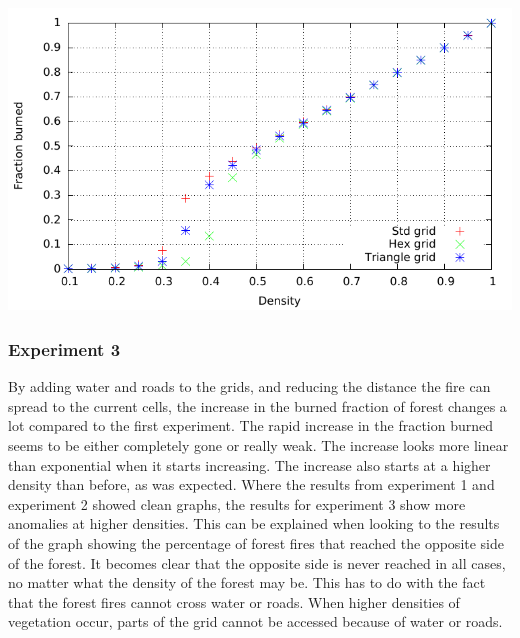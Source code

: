 \documentclass{article}
\newenvironment{Figure}
  {\par\medskip\noindent\minipage{\linewidth}}
  {\endminipage\par\medskip}
\begin{document}
\begin{multicols}{2}
\begin{Figure}
 \centering
 \includegraphics[width=\textwidth]{imgs/plot/ex2/fracburned.pdf}
\label{fig:ex2frac}
\end{Figure}
\subsubsection*{Experiment 3}
By adding water and roads to the grids, and reducing the distance the fire can spread to the current cells, the increase in the burned fraction of forest changes a lot compared to the first experiment. The rapid increase in the fraction burned seems to be either completely gone or really weak. The increase looks more linear than exponential when it starts increasing. The increase also starts at a higher density than before, as was expected. Where the results from experiment 1 and experiment 2 showed clean graphs, the results for experiment 3 show more anomalies at higher densities. This can be explained when looking to the results of the graph showing the percentage of forest fires that reached the opposite side of the forest. It becomes clear that the opposite side is never reached in all cases, no matter what the density of the forest may be. This has to do with the fact that the forest fires cannot cross water or roads. When higher densities of vegetation occur, parts of the grid cannot be accessed because of water or roads.

\end{multicols}
\end{document}
